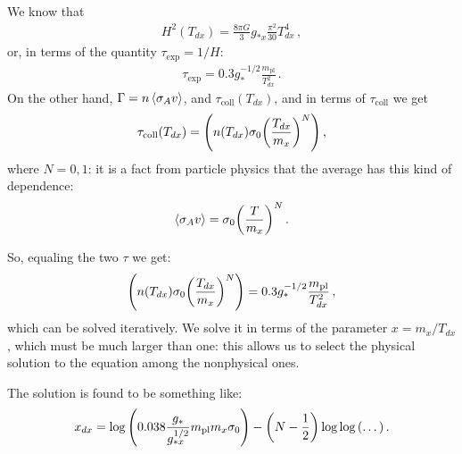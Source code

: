 \documentclass[main.tex]{subfiles}
\begin{document}
We know that 
%
\begin{align}
  H^2 (T_{dx}) = \frac{8 \pi G}{3} g_{*x} \frac{\pi^2}{30} T_{dx}^{4}
\,,
\end{align}
%
or, in terms of the quantity \(\tau_{\text{exp}}= 1/H\):
%
\begin{align}
  \tau_{\text{exp}} = 0.3 g_{*}^{-1/2} \frac{m _{\text{pl}}}{T_{dx}^2}
\,.
\end{align}
%
On the other hand, \(\Gamma = n \expval{\sigma _A v}\), and \(\tau _{\text{coll}} ( T_{dx})\), and in terms of \(\tau _{\text{coll}}\) we get 
%
\begin{align}
  \tau _{\text{coll}} (T_{dx}) = \qty(n(T_{dx}) \sigma _0 \qty(\frac{T_{dx}}{m_x})^{N})
\,,
\end{align}
%
where \(N = 0,1\): it is a fact from particle physics that the average has this kind of dependence: 
%
\begin{align}
  \expval{\sigma _A v} = \sigma_0 \qty(\frac{T}{m_x})^{N}
\,.
\end{align}

So, equaling the two \(\tau \) we get: 
%
\begin{align}
\qty(n(T_{dx}) \sigma _0 \qty(\frac{T_{dx}}{m_x})^{N})= 0.3 g_{*}^{-1/2} \frac{m _{\text{pl}}}{T_{dx}^2}
\,,
\end{align}
%
which can be solved iteratively. We solve it in terms of the parameter \(x = m_x / T_{dx}\), which must be much larger than one: this allows us to select the physical solution to the equation among the nonphysical ones. 

The solution is found to be something like: 
%
\begin{align}
  x_{dx} = \log \qty(\num{.038} \frac{g_{*}}{g_{*x}^{1/2}} m _{\text{pl}}  m_x \sigma_0 ) - \qty(N - \frac{1}{2}) \log \log \qty(\dots)
\,. 
\end{align}
%
\end{document}

